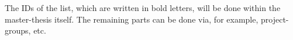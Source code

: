 
The IDs of the list, which are written in bold letters, will be done within the master-thesis itself. The remaining parts can be done via, for example, project-groups, etc. 

